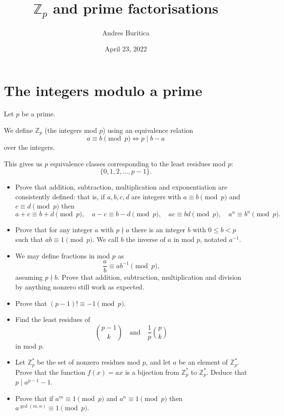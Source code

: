 \documentclass{article}
\title{$\mathbb Z_p$ and prime factorisations}
\author{Andres Buritica}
\date{April 23, 2022}
\begin{document}
\maketitle
\section{The integers modulo a prime}
  Let $p$ be a prime.

  We define $\mathbb Z_p$ (the integers mod $p$) using an equivalence relation
  \[a\equiv b\pmod p\iff p\mid b-a\]
  over the integers.

  This gives us $p$ equivalence classes corresponding to the least residues mod
  $p$: \[\{0,1,2,\ldots,p-1\}.\]
  \begin{itemize}
    \item Prove that addition, subtraction, multiplication and exponentiation
      are consistently defined: that
      is, if $a,b,c,d$ are integers with $a\equiv b\pmod p$ and $c\equiv d\pmod
      p$ then \[a+c\equiv b+d\pmod p,\quad a-c\equiv b-d\pmod p,\quad ac\equiv
        bd\pmod p,\quad a^n\equiv b^n\pmod p.\]
    \item Prove that for any integer $a$ with $p\nmid a$ there is an integer $b$
      with $0\le b<p$ such that $ab\equiv 1\pmod p$. We call $b$ the inverse of
      $a$ in mod $p$, notated $a^{-1}$.
    \item We may define fractions in mod $p$ as \[\frac ab\equiv ab^{-1}\pmod p,\]
      assuming $p\nmid b$. Prove that addition, subtraction, multiplication
      and division by anything nonzero still work as expected.
    \item Prove that $(p-1)!\equiv -1\pmod p$.
    \item Find the least residues of 
      \[\binom {p-1}k\quad\text{and}\quad\frac1p\binom pk\] in mod $p$.
    \item Let $\mathbb Z_p^*$ be the set of nonzero residues mod $p$, and let $a$ be an
      element of $\mathbb Z_p^*$. Prove that the function $f(x)=ax$ is a
      bijection from $\mathbb Z_p^*$ to $\mathbb Z_p^*$. Deduce that $p\mid
      a^{p-1}-1$.
    \item Prove that if $a^m\equiv 1\pmod p$ and $a^n\equiv 1\pmod p$ then
      $a^{\gcd(m,n)}\equiv 1\pmod p$.
  \end{itemize}
  \newpage
\end{document}
